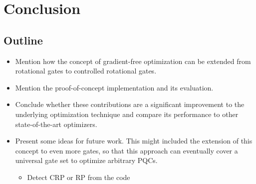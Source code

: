 \chapter{Conclusion}
\label{chap:conclusion}

\section{Outline}
\begin{itemize}
    \item
        Mention how the concept of gradient-free optimization can be
        extended from rotational gates to controlled rotational gates.
    \item
        Mention the proof-of-concept implementation and its evaluation.
    \item
        Conclude whether these contributions are a
        significant improvement to the underlying optimization technique
        and compare its performance to other state-of-the-art optimizers.
    \item
        Present some ideas for future work.
        This might included the extension of this concept to even more
        gates, so that this approach can eventually cover a universal gate
        set to optimize arbitrary PQCs.
        \begin{itemize}
            \item Detect CRP or RP from the code
        \end{itemize}
\end{itemize}
